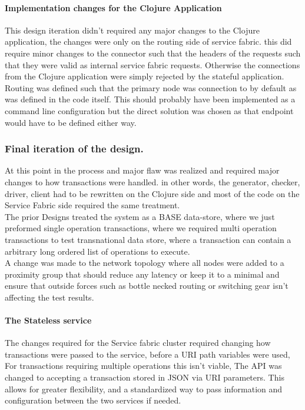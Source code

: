 \documentclass[a4paper,10pt,titlepage]{report}
\begin{document}
\paragraph*{Implementation changes for the Clojure Application}
This design iteration didn't required any major changes to the Clojure application, the changes were only on the routing side of service fabric. this did require minor changes to the connector such that the headers of the requests such that they were valid as internal service fabric requests. Otherwise  the connections from the Clojure application were simply rejected by the stateful application. Routing was defined such that the primary node was connection to by default as was defined in the code itself. This should probably have been implemented as a command line configuration but the direct solution was chosen as that endpoint would have to be defined either way. 


\subsubsection{Final iteration of the design.}
At this point in the process and major flaw was realized and required major changes to how transactions were handled. in other words, the generator, checker, driver, client had to be rewritten on the Clojure side and most of the code on the Service Fabric side required the same treatment. 
\\
The prior Designs treated the system as a BASE data-store, where we just preformed single operation transactions, where we required multi operation transactions to test transnational data store, where a transaction can contain a  arbitrary long ordered list of operations to execute. 
\\
A change was made to the network topology where all nodes were added to a proximity group that should reduce any latency or keep it to a minimal and ensure that outside forces such as bottle necked routing or switching gear isn't affecting the test results.  \\


\paragraph*{The Stateless service}

The changes required for the Service fabric cluster required changing how transactions were passed to the service, before a URI path variables were used, For transactions requiring multiple operations this isn't viable, The API was changed to accepting a transaction stored in JSON via URI parameters. This allows for greater flexibility, and a standardized way to pass information and configuration between the two services if needed. 
\end{document}
